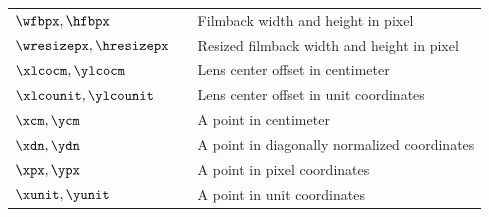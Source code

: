 \documentclass[10pt,a4paper]{article}
\begin{document}
\begin{appendix}
\begin{tabular}{lll}
$\wfbpx,\hfbpx$ & & Filmback width and height in pixel \\
$\wresizepx,\hresizepx$ & & Resized filmback width and height in pixel \\
$\xlcocm,\ylcocm$ & & Lens center offset in centimeter \\
$\xlcounit,\ylcounit$ & & Lens center offset in unit coordinates \\
$\xcm,\ycm$ & & A point in centimeter \\
$\xdn,\ydn$ & & A point in diagonally normalized coordinates \\
$\xpx,\ypx$ & & A point in pixel coordinates \\
$\xunit,\yunit$ & & A point in unit coordinates \\
\end{tabular}
\end{appendix}
\end{document}
